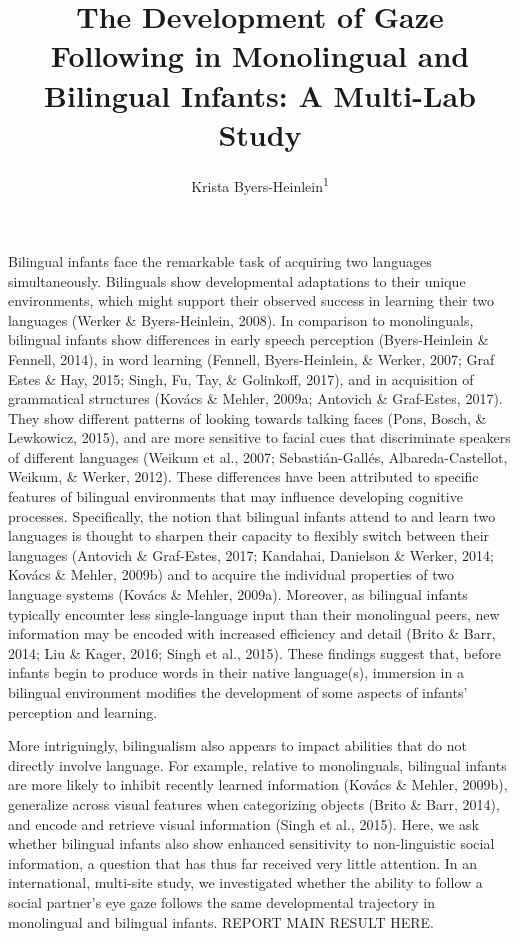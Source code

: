 \documentclass[,man,floatsintext]{apa6}
\title{The Development of Gaze Following in Monolingual and Bilingual Infants: A Multi-Lab Study}
\author{Krista Byers-Heinlein\textsuperscript{1}}
\date{}
\affiliation{
\vspace{0.5cm}
\textsuperscript{1} Concordia University}
\begin{document}
\maketitle

Bilingual infants face the remarkable task of acquiring two languages simultaneously. Bilinguals show developmental adaptations to their unique environments, which might support their observed success in learning their two languages (Werker \& Byers-Heinlein, 2008). In comparison to monolinguals, bilingual infants show differences in early speech perception (Byers-Heinlein \& Fennell, 2014), in word learning (Fennell, Byers-Heinlein, \& Werker, 2007; Graf Estes \& Hay, 2015; Singh, Fu, Tay, \& Golinkoff, 2017), and in acquisition of grammatical structures (Kovács \& Mehler, 2009a; Antovich \& Graf-Estes, 2017). They show different patterns of looking towards talking faces (Pons, Bosch, \& Lewkowicz, 2015), and are more sensitive to facial cues that discriminate speakers of different languages (Weikum et al., 2007; Sebastián-Gallés, Albareda-Castellot, Weikum, \& Werker, 2012). These differences have been attributed to specific features of bilingual environments that may influence developing cognitive processes. Specifically, the notion that bilingual infants attend to and learn two languages is thought to sharpen their capacity to flexibly switch between their languages (Antovich \& Graf-Estes, 2017; Kandahai, Danielson \& Werker, 2014; Kovács \& Mehler, 2009b) and to acquire the individual properties of two language systems (Kovács \& Mehler, 2009a). Moreover, as bilingual infants typically encounter less single-language input than their monolingual peers, new information may be encoded with increased efficiency and detail (Brito \& Barr, 2014; Liu \& Kager, 2016; Singh et al., 2015). These findings suggest that, before infants begin to produce words in their native language(s), immersion in a bilingual environment modifies the development of some aspects of infants' perception and learning.

More intriguingly, bilingualism also appears to impact abilities that do not directly involve language. For example, relative to monolinguals, bilingual infants are more likely to inhibit recently learned information (Kovács \& Mehler, 2009b), generalize across visual features when categorizing objects (Brito \& Barr, 2014), and encode and retrieve visual information (Singh et al., 2015). Here, we ask whether bilingual infants also show enhanced sensitivity to non-linguistic social information, a question that has thus far received very little attention. In an international, multi-site study, we investigated whether the ability to follow a social partner's eye gaze follows the same developmental trajectory in monolingual and bilingual infants. REPORT MAIN RESULT HERE.
\end{document}
